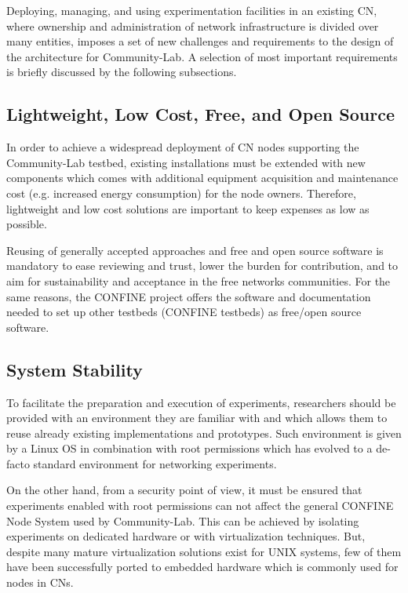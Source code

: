 \documentclass[conference]{IEEEtran}
\begin{document}
Deploying, managing, and using experimentation facilities in an
existing CN, where ownership and administration of network
infrastructure is divided over many entities, imposes a set of new
challenges and requirements to the design of the
architecture for Community-Lab. A selection of most important requirements is briefly
discussed by the following subsections.


\subsection{Lightweight, Low Cost, Free, and Open Source}

In order to achieve a widespread deployment of CN nodes supporting the
Community-Lab testbed, existing installations must be extended with new
components which comes with additional equipment acquisition and
maintenance cost (e.g. increased energy consumption) for the node
owners. Therefore, lightweight and low cost solutions are important to
keep expenses as low as possible.

Reusing of generally accepted approaches and free and open source
software is mandatory to ease reviewing and trust, lower the burden
for contribution, and to aim for sustainability and acceptance in the
free networks communities. For the same reasons, the CONFINE project
offers the software and documentation needed to set up other testbeds
(CONFINE testbeds) as free/open source software.

\subsection{System Stability}

To facilitate the preparation and execution of experiments,
researchers should be provided with an environment they are familiar
with and which allows them to reuse already existing implementations
and prototypes.  Such environment is given by a Linux OS in
combination with root permissions which has evolved to a de-facto
standard environment for networking experiments.

On the other hand, from a security point of view, it must be ensured
that experiments enabled with root permissions can not affect the
general CONFINE Node System used by Community-Lab. This can be achieved by isolating
experiments on dedicated hardware or with virtualization techniques.
But, despite many mature virtualization solutions exist for UNIX
systems, few of them have been successfully ported to embedded
hardware which is commonly used for nodes in CNs.
\end{document}
